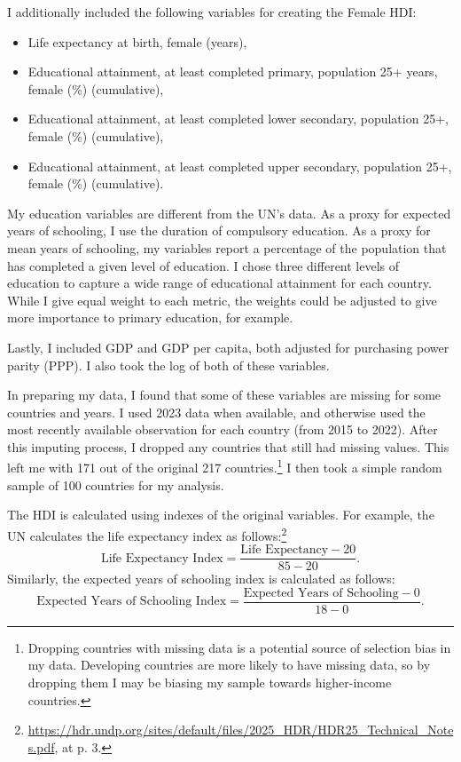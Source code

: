 \documentclass[12pt]{article}
\begin{document}
I additionally included the following variables for creating the Female HDI:
\begin{itemize}
    \singlespace
    \item Life expectancy at birth, female (years),
    \item Educational attainment, at least completed primary, population 25+ years, female (\%) (cumulative),
    \item Educational attainment, at least completed lower secondary, population 25+, female (\%) (cumulative),
    \item Educational attainment, at least completed upper secondary, population 25+, female (\%) (cumulative).
\end{itemize}

My education variables are different from the UN's data. As a proxy for expected years of schooling, I use the duration of compulsory education. As a proxy for mean years of schooling, my variables report a percentage of the population that has completed a given level of education. I chose three different levels of education to capture a wide range of educational attainment for each country. While I give equal weight to each metric, the weights could be adjusted to give more importance to primary education, for example.

Lastly, I included GDP and GDP per capita, both adjusted for purchasing power parity (PPP). I also took the log of both of these variables.

In preparing my data, I found that some of these variables are missing for some countries and years. I used 2023 data when available, and otherwise used the most recently available observation for each country (from 2015 to 2022). After this imputing process, I dropped any countries that still had missing values. This left me with 171 out of the original 217 countries.\footnote{Dropping countries with missing data is a potential source of selection bias in my data. Developing countries are more likely to have missing data, so by dropping them I may be biasing my sample towards higher-income countries.} I then took a simple random sample of 100 countries for my analysis.

The HDI is calculated using indexes of the original variables. For example, the UN calculates the life expectancy index as follows:\footnote{\url{https://hdr.undp.org/sites/default/files/2025_HDR/HDR25_Technical_Notes.pdf}, at p. 3.}
$$\text{Life Expectancy Index} = \frac{\text{Life Expectancy} - 20}{85 - 20}.$$
Similarly, the expected years of schooling index is calculated as follows:
$$\text{Expected Years of Schooling Index} = \frac{\text{Expected Years of Schooling} - 0}{18 - 0}.$$
\end{document}

